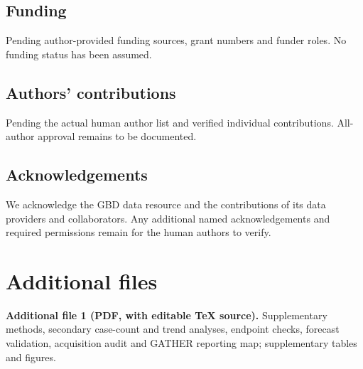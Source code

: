 \documentclass[11pt,a4paper]{article}
\begin{document}
\subsection*{Funding}
Pending author-provided funding sources, grant numbers and funder roles. No funding status has been assumed.
\subsection*{Authors' contributions}
Pending the actual human author list and verified individual contributions. All-author approval remains to be documented.
\subsection*{Acknowledgements}
We acknowledge the GBD data resource and the contributions of its data providers and collaborators. Any additional named acknowledgements and required permissions remain for the human authors to verify.

\section*{Additional files}
\textbf{Additional file 1 (PDF, with editable TeX source).} Supplementary methods, secondary case-count and trend analyses, endpoint checks, forecast validation, acquisition audit and GATHER reporting map; supplementary tables and figures.
\end{document}
